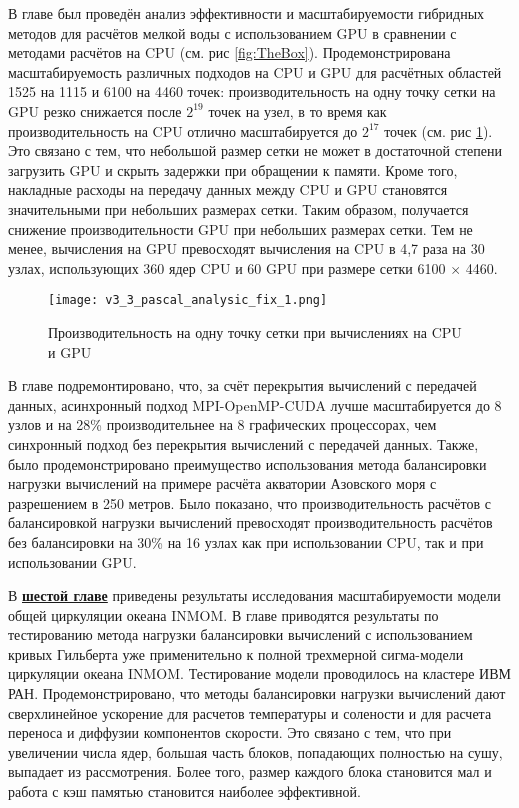 В главе был проведён анализ эффективности и масштабируемости гибридных методов для расчётов мелкой воды с использованием GPU в сравнении с методами расчётов на CPU (см. рис \ref{fig:TheBox}). 
Продемонстрирована масштабируемость различных подходов на CPU и GPU для расчётных областей 1525 на 1115 и 6100 на 4460 точек: производительность на одну точку сетки на GPU резко снижается после $2^{19}$ точек на узел, в то время как производительность на CPU отлично масштабируется до $2^{17}$ точек (см. рис \ref{fig:TheBox_full}). Это связано с тем, что небольшой размер сетки не может в достаточной степени загрузить GPU и скрыть задержки при обращении к памяти. Кроме того, накладные расходы на передачу данных между CPU и GPU становятся значительными при небольших размерах сетки. Таким образом, получается снижение производительности GPU при небольших размерах сетки.  Тем не менее, вычисления на GPU превосходят вычисления на CPU в 4,7 раза на 30 узлах, использующих 360 ядер CPU и 60 GPU при размере сетки 6100 $\times$ 4460.  

\begin{figure}[!ht]
	\begin{minipage}{1\linewidth}
	\centering
	\texttt{[image: v3\_3\_pascal\_analysic\_fix\_1.png]}
	\end{minipage}
	\vspace{3pt}
	\caption{Производительность на одну точку сетки при вычислениях на CPU и GPU}
	\label{fig:TheBox_full}
\end{figure}

В главе подремонтировано, что, за счёт перекрытия вычислений с передачей данных, асинхронный подход MPI-OpenMP-CUDA лучше масштабируется до 8 узлов и на 28\% производительнее на 8 графических процессорах, чем синхронный подход без перекрытия вычислений с передачей данных. Также, было продемонстрировано преимущество использования метода балансировки нагрузки вычислений на примере расчёта акватории Азовского моря с разрешением в 250 метров. Было показано, что производительность расчётов с балансировкой нагрузки вычислений превосходят производительность расчётов без балансировки на 30\% на 16 узлах как при использовании CPU, так и при использовании GPU.

В \underline{\textbf{шестой главе}} приведены результаты исследования масштабируемости модели общей циркуляции океана INMOM.
В главе приводятся результаты по тестированию метода нагрузки балансировки вычислений с использованием кривых Гильберта уже примени­тельно к полной трехмерной сигма-модели циркуляции океана INMOM. Тестирование модели проводилось на кластере ИВМ РАН.
Продемонстрировано, что методы балансировки нагрузки вычислений дают сверхлинейное ускорение для расче­тов температуры и солености и для расчета переноса и диффузии компонентов скорости. Это связано с тем, что при увеличении числа ядер, большая часть
блоков, попадающих полностью на сушу, выпадает из рассмотрения. Более то­го, размер каждого блока становится мал и работа с кэш памятью становится наиболее эффективной.


